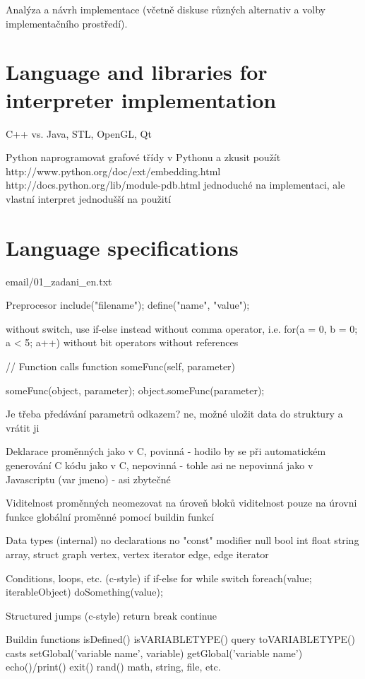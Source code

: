 \documentclass[11pt,twoside,a4paper]{book}
\begin{document}
Analýza a návrh implementace (včetně diskuse různých alternativ a volby implementačního prostředí).

\section{Language and libraries for interpreter implementation}

C++ vs. Java, STL, OpenGL, Qt

Python
	naprogramovat grafové třídy v Pythonu a zkusit použít
	http://www.python.org/doc/ext/embedding.html
	http://docs.python.org/lib/module-pdb.html
	jednoduché na implementaci, ale vlastní interpret jednodušší na použití

\section{Language specifications}

email/01\_zadani\_en.txt

Preprocesor
include("filename");
define("name", "value");


without switch, use if-else instead
without comma operator, i.e. for(a = 0, b = 0; a < 5; a++)
without bit operators
without references

// Function calls
function someFunc(self, parameter)
{

}

someFunc(object, parameter);
object.someFunc(parameter);

Je třeba předávání parametrů odkazem?
	ne, možné uložit data do struktury a vrátit ji

Deklarace proměnných
	jako v C, povinná - hodilo by se při automatickém generování C kódu
	jako v C, nepovinná - tohle asi ne
	nepovinná jako v Javascriptu (var jmeno) - asi zbytečné

Viditelnost proměnných
	neomezovat na úroveň bloků
	viditelnost pouze na úrovni funkce
	globální proměnné pomocí buildin funkcí

Data types (internal)
	no declarations
	no "const" modifier
	null
	bool
	int
	float
	string
	array, struct
		graph
		vertex, vertex iterator
		edge, edge iterator

Conditions, loops, etc. (c-style)
	if
	if-else
	for
	while
	switch
	foreach(value; iterableObject) doSomething(value);

Structured jumps (c-style)
	return
	break
	continue

Buildin functions
	isDefined()
	isVARIABLETYPE() query
	toVARIABLETYPE() casts
	setGlobal('variable name', variable)
	getGlobal('variable name')
	echo()/print()
	exit()
	rand()
	math, string, file, etc.
\end{document}
